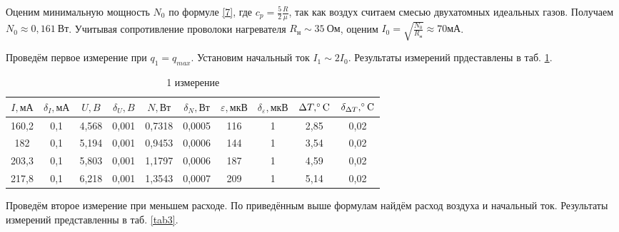 \documentclass[a4paper, 12pt]{article}
\begin{document}
Оценим минимальную мощность $N_0$ по формуле \eqref{7}, где $c_p = \frac{5}{2}\frac{R}{\mu}$, так как воздух считаем смесью двухатомных идеальных газов. Получаем $N_0 \approx 0,161~Вт$. Учитывая сопротивление проволоки нагревателя $R_н \sim 35~Ом$, оценим $I_0 = \sqrt{\frac{N_0}{R_н}} \approx 70 мА$.

Проведём первое измерение при $q_1 = q_{max}$. Установим начальный ток $I_1 \sim 2I_0$. Результаты измерений прдеставлены в таб. \ref{tab2}.

\begin{table}[h!]
\begin{center}
\begin{tabular}{|c|c|c|c|c|c|c|c|c|c|}
\hline
$I, мА$ & $\delta_{I}, мА$ & $U, B$ & $\delta_{U}, B$ & $N, Вт$ & $\delta_{N}, Вт$ & $\varepsilon, мкВ$ & $\delta_{\varepsilon}, мкВ$ & $\Delta{T}, \celsius$ & $\delta_{\Delta{T}}, \celsius$ \\ \hline
160,2   & 0,1              & 4,568  & 0,001           & 0,7318  & 0,0005           & 116                & 1                                                            & 2,85                  & 0,02                           \\ \hline
182     & 0,1              & 5,194  & 0,001           & 0,9453  & 0,0006           & 144                & 1                                                            & 3,54                  & 0,02                           \\ \hline
203,3   & 0,1              & 5,803  & 0,001           & 1,1797  & 0,0006           & 187                & 1                                                            & 4,59                  & 0,02                           \\ \hline
217,8   & 0,1              & 6,218  & 0,001           & 1,3543  & 0,0007           & 209                & 1                                                            & 5,14                  & 0,02                           \\ \hline
\end{tabular}
\caption{1 измерение}
\label{tab2}
\end{center}
\end{table}

Проведём второе измерение при меньшем расходе. По приведённым выше формулам найдём расход воздуха и начальный ток. Результаты измерений представленны в таб. \ref{tab3}.
\end{document}
